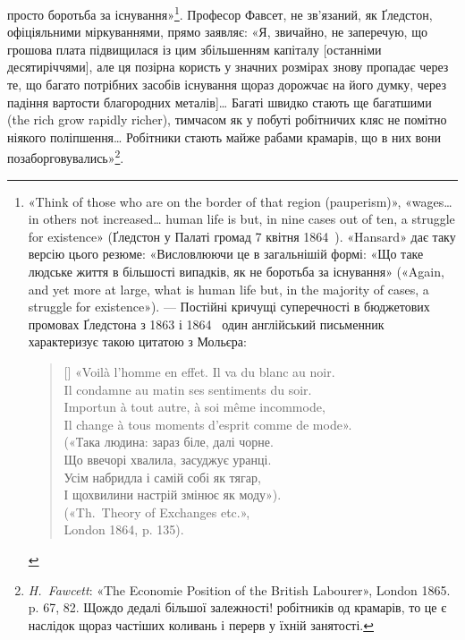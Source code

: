 просто боротьба за існування»\footnote{
«Think of those who are on the border of that region (pauperism)»,
«wages\dots{} in others not increased\dots{} human life is but, in nine cases out of ten,
a struggle for existence» (Ґледстон у Палаті громад 7 квітня 1864~).
«Hansard» дає таку версію цього резюме: «Висловлюючи це в загальнішій
формі: «Що таке людське життя в більшості випадків, як не боротьба
за існування» («Again, and yet more at large, what is human life but,
in the majority of cases, a struggle for existence»). — Постійні кричущі суперечності
в бюджетових промовах Ґледстона з 1863 і 1864~ один англійський
письменник характеризує такою цитатою з Мольєра:

\settowidth{\versewidth}{Il change à tous moments d’esprit comme de mode».}
\begin{verse}[\versewidth]
«Voilà l’homme en effet. Il va du blanc au noir. \\
Il condamne au matin ses sentiments du soir. \\
Importun à tout autre, à soi même incommode, \\
Il change à tous moments d’esprit comme de mode». \\

(«Така людина: зараз біле, далі чорне. \\
Що ввечорі хвалила, засуджує уранці. \\
Усім набридла і самій собі як тягар, \\
І щохвилини настрій змінює як моду»). \\

(«Th.~Theory of Exchanges etc.», \\
London 1864, p. 135).
\end{verse}

}. Професор Фавсет, не зв’язаний,
як Ґледстон, офіціяльними міркуваннями, прямо заявляє:
«Я, звичайно, не заперечую, що грошова плата підвищилася із
цим збільшенням капіталу [останніми десятиріччями], але ця
позірна користь у значних розмірах знову пропадає через те,
що багато потрібних засобів існування щораз дорожчає на його
думку, через падіння вартости благородних металів]\dots{} Багаті
швидко стають ще багатшими (the rich grow rapidly richer),
тимчасом як у побуті робітничих кляс не помітно ніякого поліпшення\dots{}
Робітники стають майже рабами крамарів, що в них
вони позаборговувались»\footnote{
\emph{H.~Fawcett}: «The Economie Position of the British Labourer»,
London 1865. p. 67, 82. Щождо дедалі більшої залежності! робітників од
крамарів, то це є наслідок щораз частіших коливань і перерв у їхній
занятості.
}.

